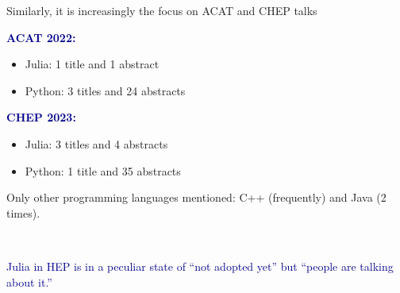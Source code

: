 \documentclass[aspectratio=169]{beamer}
\begin{document}

\begin{frame}{Similarly, it is increasingly the focus on ACAT and CHEP talks}
\vspace{0.5 cm}

\textcolor{darkblue}{\Large\bf ACAT 2022:}
\begin{itemize}
\item Julia: 1 title and 1 abstract
\item Python: 3 titles and 24 abstracts
\end{itemize}

\vspace{0.5 cm}
\textcolor{darkblue}{\Large\bf CHEP 2023:}
\begin{itemize}
\item Julia: 3 titles and 4 abstracts
\item Python: 1 title and 35 abstracts
\end{itemize}

\vspace{0.5 cm}
Only other programming languages mentioned: C++ (frequently) and Java (2 times).
\end{frame}

\begin{frame}{\mbox{ }}
\vspace{0.5 cm}
\LARGE
\begin{center}
\textcolor{darkblue}{Julia in HEP is in a peculiar state of ``not adopted yet'' but ``people are talking about it.''}

\vspace{1 cm}
\end{center}
\end{frame}

\begin{frame}{}

\end{frame}
\end{document}
